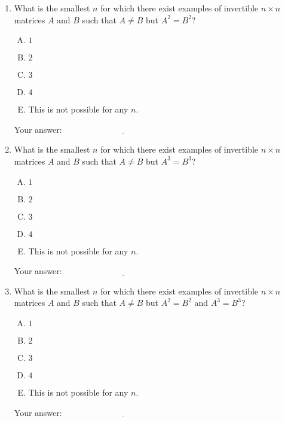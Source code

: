 \documentclass[10pt]{amsart}
\begin{document}
\begin{enumerate}
\item What is the smallest $n$ for which there exist examples of
  invertible $n \times n$ matrices $A$ and $B$ such that $A \ne B$ but
  $A^2 = B^2$?

  \begin{enumerate}[(A)]
  \item $1$
  \item $2$
  \item $3$
  \item $4$
  \item This is not possible for any $n$.
  \end{enumerate}

  \vspace{0.1in}
  Your answer: $\underline{\qquad\qquad\qquad\qquad\qquad\qquad\qquad}$
  \vspace{0.1in}

\item What is the smallest $n$ for which there exist examples of
  invertible $n \times n$ matrices $A$ and $B$ such that $A \ne B$ but
  $A^3 = B^3$?

  \begin{enumerate}[(A)]
  \item $1$
  \item $2$
  \item $3$
  \item $4$
  \item This is not possible for any $n$.
  \end{enumerate}

  \vspace{0.1in}
  Your answer: $\underline{\qquad\qquad\qquad\qquad\qquad\qquad\qquad}$
  \vspace{0.1in}

\item What is the smallest $n$ for which there exist examples of
  invertible $n \times n$ matrices $A$ and $B$ such that $A \ne B$ but
  $A^2 = B^2$ and $A^3 = B^3$?

  \begin{enumerate}[(A)]
  \item $1$
  \item $2$
  \item $3$
  \item $4$
  \item This is not possible for any $n$.
  \end{enumerate}

  \vspace{0.1in}
  Your answer: $\underline{\qquad\qquad\qquad\qquad\qquad\qquad\qquad}$
  \vspace{0.1in}


\end{enumerate}
\end{document}
